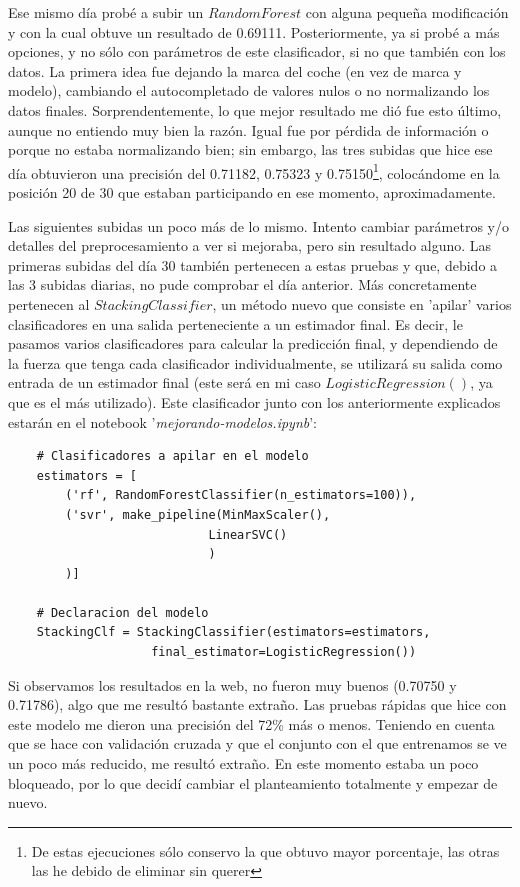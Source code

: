 \documentclass[11pt,a4paper]{article}
\begin{document}
Ese mismo día probé a subir un $RandomForest$ con alguna pequeña modificación y con la cual obtuve un resultado de 0.69111.
Posteriormente, ya si probé a más opciones, y no sólo con parámetros de este clasificador, si no que también con los datos. 
La primera idea fue dejando la marca del coche (en vez de marca y modelo), cambiando el autocompletado de valores nulos
o no normalizando los datos finales. Sorprendentemente, lo que mejor resultado me dió fue esto último, aunque no entiendo muy bien
la razón. Igual fue por pérdida de información o porque no estaba normalizando bien; sin embargo, las tres subidas que hice ese día
obtuvieron una precisión del 0.71182, 0.75323 y 0.75150\footnote{De estas ejecuciones sólo conservo la que obtuvo mayor porcentaje,
las otras las he debido de eliminar sin querer}, colocándome en la posición 20 de 30 que estaban participando en ese momento,
aproximadamente.

\label{prueba}
Las siguientes subidas un poco más de lo mismo. Intento cambiar parámetros y/o detalles del preprocesamiento a ver si mejoraba,
pero sin resultado alguno. Las primeras subidas del día 30 también pertenecen a estas pruebas y que, debido a las 3 subidas diarias,
no pude comprobar el día anterior. Más concretamente pertenecen al $StackingClassifier$, un método nuevo que consiste en 'apilar'
varios clasificadores en una salida perteneciente a un estimador final. Es decir, le pasamos varios clasificadores para calcular
la predicción final, y dependiendo de la fuerza que tenga cada clasificador individualmente, se utilizará su salida como entrada
de un estimador final (este será en mi caso $LogisticRegression()$, ya que es el más utilizado). Este clasificador junto con los
anteriormente explicados estarán en el notebook '\textit{mejorando-modelos.ipynb}':

\label{stack}
\begin{lstlisting}
    # Clasificadores a apilar en el modelo
    estimators = [
        ('rf', RandomForestClassifier(n_estimators=100)),
        ('svr', make_pipeline(MinMaxScaler(),
                            LinearSVC()
                            )
        )]

    # Declaracion del modelo
    StackingClf = StackingClassifier(estimators=estimators,
                    final_estimator=LogisticRegression())
\end{lstlisting}

Si observamos los resultados en la web, no fueron muy buenos (0.70750 y 0.71786), algo que me resultó bastante extraño. Las pruebas
rápidas que hice con este modelo me dieron una precisión del 72\% más o menos. Teniendo en cuenta que se hace con validación
cruzada y que el conjunto con el que entrenamos se ve un poco más reducido, me resultó extraño. En este momento estaba un poco
bloqueado, por lo que decidí cambiar el planteamiento totalmente y empezar de nuevo.
\end{document}
